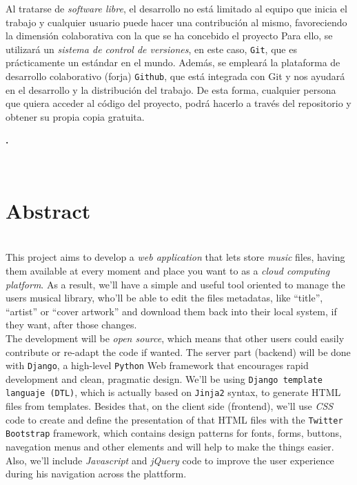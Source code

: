 Al tratarse de \textit{software libre}, el desarrollo no está limitado al equipo que inicia el trabajo y cualquier usuario puede hacer una contribución al mismo, favoreciendo la dimensión colaborativa con la que se ha concebido el proyecto Para ello, se utilizará un \textit{sistema de control de versiones}, en este caso, {\tt Git}, que es prácticamente un estándar en el mundo. Además, se empleará la plataforma de desarrollo colaborativo (forja) {\tt Github}, que está integrada con Git y nos ayudará en el desarrollo y la distribución del trabajo. De esta forma, cualquier persona que quiera acceder al código del proyecto, podrá hacerlo a través del repositorio y obtener su propia copia gratuita. \\


\newpage

\begin{center}
{\large\bfseries \myTitle. \mySubTitleENG}\\
\end{center}
\begin{center}
\myName\\
\end{center}

\section*{Abstract}

\bigskip
{} \\

This project aims to develop a \textit{web application} that lets store \textit{music} files, having them available at every moment and place you want to as a \textit{cloud computing platform}. As a result, we'll have a simple and useful tool oriented to manage the users musical library, who'll be able to edit the files metadatas, like ``title'', ``artist'' or ``cover artwork'' and download them back into their local system, if they want, after those changes. \\

The development will be \textit{open source}, which means that other users could easily contribute or re-adapt the code if wanted. The server part (backend) will be done with {\tt Django}, a high-level {\tt Python} Web framework that encourages rapid development and clean, pragmatic design. We'll be using {\tt Django template languaje (DTL)}, which is actually based on {\tt Jinja2} syntax, to generate HTML files from templates. Besides that, on the client side (frontend), we'll use \textit{CSS} code to create and define the presentation of that HTML files with the {\tt Twitter Bootstrap} framework, which contains design patterns for fonts, forms, buttons, navegation menus and other elements and will help to make the things easier. Also, we'll include \textit{Javascript} and \textit{jQuery} code to improve the user experience during his navigation across the plattform. \\

